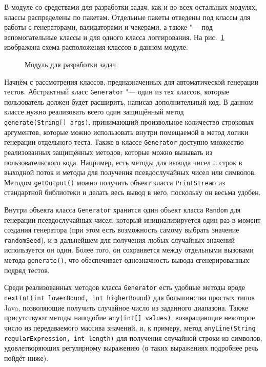 В модуле со средствами для разработки задач, как и во всех остальных модулях, классы распределены по пакетам. Отдельные пакеты отведены под классы для работы с генераторами, валидаторами и чекерами, а также "--- под вспомогательные классы и для одного класса логгирования. На рис.~\ref{package_diagram_development} изображена схема расположения классов в данном модуле.

\begin{figure}[h]
\caption{Модуль для разработки задач}
\label{package_diagram_development}
\end{figure}

Начнём с рассмотрения классов, предназначенных для автоматической генерации тестов. Абстрактный класс \texttt{Generator} "--- один из тех классов, которые пользователь должен будет расширить, написав дополнительный код. В данном классе нужно реализовать всего один защищённый метод \texttt{generate(String[]~args)}, принимающий произвольное количество строковых аргументов, которые можно использовать внутри помещаемой в метод логики генерации отдельного теста. Также в классе \texttt{Generator} доступно множество реализованных защищённых методов, которые можно вызывать из пользовательского кода. Например, есть методы для вывода чисел и строк в выходной поток и методы для получения псевдослучайных чисел или символов. Методом \texttt{getOutput()} можно получить объект класса \texttt{PrintStream} из стандартной библиотеки и делать весь вывод в него, поскольку он весьма удобен.

Внутри объекта класса \texttt{Generator} хранится один объект класса \texttt{Random} для генерации псевдослучайных чисел, который инициализируется один раз в момент создания генератора (при этом есть возможность самому выбрать значение \texttt{random\-Seed}), и в дальнейшем для получения любых случайных значений используется он один. Более того, он сохраняется между отдельными вызовами метода \texttt{generate()}, что обеспечивает однозначность вывода сгенерированных подряд тестов.

Среди реализованных методов класса \texttt{Generator} есть удобные методы вроде \texttt{nextInt(int~lowerBound, int~higherBound)} для большинства простых типов Java, позволяющие получить случайное число из заданного диапазона. Также присутствуют методы наподобие \texttt{any(int[]~values)}, возвращающие некоторое число из передаваемого массива значений, и, к примеру, метод \texttt{anyLine(String regular\-Expression, int~length)} для получения случайной строки из символов, удовлетворяющих регулярному выражению (о таких выражениях подробнее речь пойдёт ниже).

